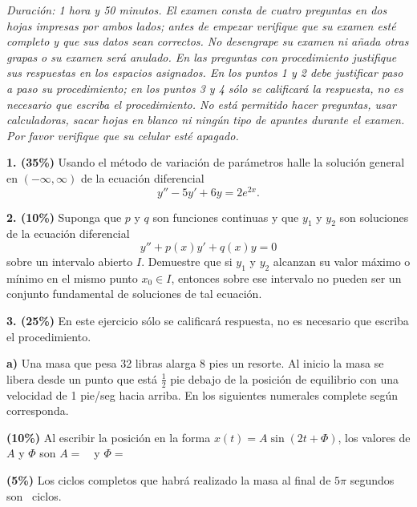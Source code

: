 \documentclass[11pt]{article}
\newcommand{\rp}{\underline{\hspace{3cm}}}
\begin{document}
\examheader

\vspace{4pt}
\noindent\textit{Duración: 1 hora y 50 minutos. El examen consta de cuatro preguntas en dos hojas impresas por ambos lados; antes de empezar verifique que su examen esté completo y que sus datos sean correctos. No desengrape su examen ni añada otras grapas o su examen será anulado. En las preguntas con procedimiento justifique sus respuestas en los espacios asignados. En los puntos 1 y 2 debe justificar paso a paso su procedimiento; en los puntos 3 y 4 sólo se calificará la respuesta, no es necesario que escriba el procedimiento. No está permitido hacer preguntas, usar calculadoras, sacar hojas en blanco ni ningún tipo de apuntes durante el examen. Por favor verifique que su celular esté apagado.}

\vspace{6pt}
\noindent\textbf{1. (35\%)} Usando el método de variación de parámetros halle la solución general en $(-\infty,\infty)$ de la ecuación diferencial
\[
y''-5y'+6y=2e^{2x}.
\]

\vspace{6cm}

\newpage

\noindent\textbf{2. (10\%)} Suponga que $p$ y $q$ son funciones continuas y que $y_1$ y $y_2$ son soluciones de la ecuación diferencial
\[
y''+p(x)y'+q(x)y=0
\]
sobre un intervalo abierto $I$. Demuestre que si $y_1$ y $y_2$ alcanzan su valor máximo o mínimo en el mismo punto $x_0\in I$, entonces sobre ese intervalo no pueden ser un conjunto fundamental de soluciones de tal ecuación.

\vspace{6cm}

\newpage

\noindent\textbf{3. (25\%)} En este ejercicio sólo se calificará respuesta, no es necesario que escriba el procedimiento.

\vspace{0.2cm}
\noindent\textbf{a)} Una masa que pesa 32 libras alarga 8 pies un resorte. Al inicio la masa se libera desde un punto que está $\frac{1}{2}$ pie debajo de la posición de equilibrio con una velocidad de 1 pie/seg hacia arriba. En los siguientes numerales complete según corresponda.
\begin{opciones}
\item \textbf{(10\%)} Al escribir la posición en la forma $x(t)=A\sin(2t+\Phi)$, los valores de $A$ y $\Phi$ son $A=$~\rp\ y $\Phi=$~\rp
\item \textbf{(5\%)} Los ciclos completos que habrá realizado la masa al final de $5\pi$ segundos son \rp\ ciclos.
\end{opciones}
\end{document}
